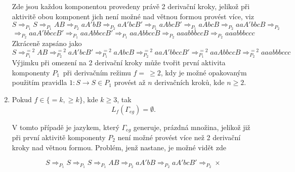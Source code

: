 \begin{priklad}
\begin{enumerate}
      Zde jsou každou komponentou provedeny právě 2 derivační kroky, jelikož při aktivitě obou komponent jich není možné nad větnou formou provést více, viz
      $$S \Rightarrow_{P_1} S \Rightarrow_{P_1} AB \Rightarrow_{P_2} a A' b B \Rightarrow_{P_2} a A' b c B' \Rightarrow_{P_1} a A b c B' \Rightarrow_{P_1} a A b c B \Rightarrow_{P_2} a a A' b b c B \Rightarrow_{P_2}$$
      $$\Rightarrow_{P_2} a a A' b b c c B' \Rightarrow_{P_1} a a A b b c c B' \Rightarrow_{P_1} a a A b b c c B \Rightarrow_{P_2} a a a b b b c c B \Rightarrow_{P_2} a a a b b b c c c$$
      Zkráceně zapsáno jako
      $$S \Rightarrow_{P_1}^{=2} AB \Rightarrow_{P_2}^{=2} a A' b c B' \Rightarrow_{P_1}^{=2} a A b c B \Rightarrow_{P_2}^{=2}
      a a A' b b c c B' \Rightarrow_{P_1}^{=2} a a A b b c c B \Rightarrow_{P_2}^{=2} a a a b b b c c c$$
      Výjimku při omezení na 2 derivační kroky může tvořit první aktivita komponenty $P_1$~při derivačním režimu $ f =\ \geq\!2$, kdy je možné opakovaným použitím pravidla \linebreak $1\!: S \rightarrow S \in P_1$ provést
      až $n$ derivačních kroků, kde $n \geq 2$.

      \item Pokud $f \in \{=\!k, \geq\!k\}$, kde $k \geq 3$, tak
      $$L_f(\Gamma_{eg}) = \emptyset.$$

      V tomto případě je jazykem, který $\Gamma_{eg}$ generuje, prázdná množina, jelikož již při první aktivitě komponenty $P_2$ není možné provést více než 2 derivační kroky nad větnou formou.
      Problém, jenž nastane, je možné vidět zde

      $$S \Rightarrow_{P_1} S \Rightarrow_{P_1} S \Rightarrow_{P_1} AB \Rightarrow_{P_2} a A' b B \Rightarrow_{P_2} a A' b c B' \Rightarrow_{P_2} \times$$
    \end{enumerate}
\end{priklad}


